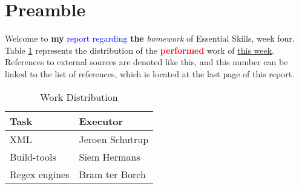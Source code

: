 \section{Preamble}
Welcome to \textbf{my} \textcolor{blue}{report regarding} \textbf{the} \textit{homework} of Essential Skills, week four. Table \ref{table:distribution} represents the distribution of the \textbf{\textcolor{red}{performed}} work of \underline{this week}. References to external sources are denoted like this\cite[99]{Silberschatz:Galvin:2009}, and this number can be linked to the list of references, which is located at the last page of this report.

\begin{table}[h]
\begin{center}
\begin{tabular}{ | l | l | }
	\hline
	\textbf{Task}	&	\textbf{Executor}	\\
	\hline
	XML		&	Jeroen Schutrup		\\
	\hline
	Build-tools	&	Siem Hermans		\\
	\hline
	Regex engines	&	Bram ter Borch		\\
	\hline
\end{tabular}
\caption{Work Distribution}
\label{table:distribution}
\end{center}
\end{table}
